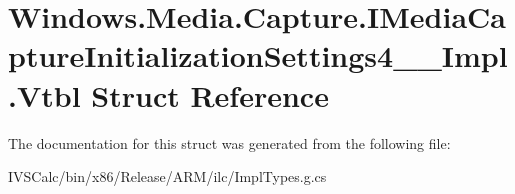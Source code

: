\hypertarget{struct_windows_1_1_media_1_1_capture_1_1_i_media_capture_initialization_settings4_____impl_1_1_vtbl}{}\section{Windows.\+Media.\+Capture.\+I\+Media\+Capture\+Initialization\+Settings4\+\_\+\+\_\+\+Impl.\+Vtbl Struct Reference}
\label{struct_windows_1_1_media_1_1_capture_1_1_i_media_capture_initialization_settings4_____impl_1_1_vtbl}


The documentation for this struct was generated from the following file\+:\begin{DoxyCompactItemize}
\item 
I\+V\+S\+Calc/bin/x86/\+Release/\+A\+R\+M/ilc/Impl\+Types.\+g.\+cs\end{DoxyCompactItemize}
